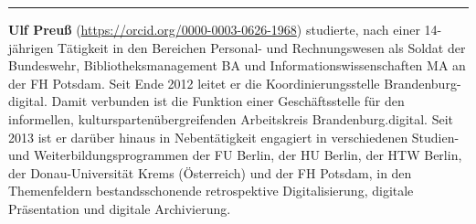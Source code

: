 \begin{center}\rule{0.5\linewidth}{0.5pt}\end{center}

\textbf{Ulf Preuß} (\url{https://orcid.org/0000-0003-0626-1968}) studierte, nach einer
14-jährigen Tätigkeit in den Bereichen Personal- und Rechnungswesen
als Soldat der Bundeswehr, Bibliotheksmanagement BA und
Informationswissenschaften MA an der FH Potsdam. Seit Ende 2012 leitet
er die Koordinierungsstelle Brandenburg-digital. Damit verbunden ist die
Funktion einer Geschäftsstelle für den informellen,
kulturspartenübergreifenden Arbeitskreis Brandenburg.digital. Seit 2013
ist er darüber hinaus in Nebentätigkeit engagiert in verschiedenen
Studien- und Weiterbildungsprogrammen der FU Berlin, der HU Berlin, der
HTW Berlin, der Donau-Universität Krems (Österreich) und der FH Potsdam,
in den Themenfeldern bestandsschonende retrospektive Digitalisierung,
digitale Präsentation und digitale Archivierung.
